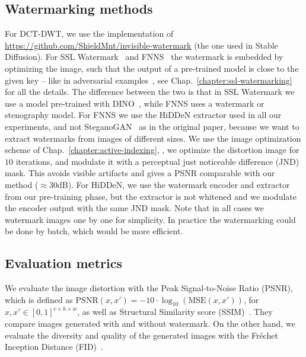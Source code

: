 \subsection{Watermarking methods}\label{chap3/app:watermarking}
For DCT-DWT, we use the implementation of \url{https://github.com/ShieldMnt/invisible-watermark} (the one used in Stable Diffusion).
For SSL Watermark~\citep{fernandez2022sslwatermarking} and FNNS~\citep{kishore2021fixed} the watermark is embedded by optimizing the image, such that the output of a pre-trained model is close to the given key -- like in adversarial examples~\citep{goodfellow2014adversarial}, see Chap.~\ref{chapter:ssl-watermarking} for all the details.
The difference between the two is that in SSL Watermark we use a model pre-trained with DINO~\citep{caron2021dino}, while FNNS uses a watermark or stenography model.
For FNNS we use the HiDDeN extractor used in all our experiments, and not SteganoGAN~\citep{zhang2019steganogan} as in the original paper, because we want to extract watermarks from images of different sizes.
We use the image optimization scheme of Chap.~\ref{chapter:active-indexing}, \ie, we optimize the distortion image for $10$ iterations, and modulate it with a perceptual just noticeable difference (JND) mask.
This avoids visible artifacts and gives a PSNR comparable with our method ($\approx 30$dB).
For HiDDeN, we use the watermark encoder and extractor from our pre-training phase, but the extractor is not whitened and we modulate the encoder output with the same JND mask.
Note that in all cases we watermark images one by one for simplicity. 
In practice the watermarking could be done by batch, which would be more efficient. 









\subsection{Evaluation metrics}\label{chap3/app:metrics}

We evaluate the image distortion with the Peak Signal-to-Noise Ratio (PSNR), which is defined as $\mathrm{PSNR}(x,x') = -10\cdot \log_{10} (\mathrm{MSE}(x,x'))$, for $x,x'\in [0,1]^{c\times h\times w}$, as well as Structural Similarity score (SSIM)~\citep{wang2004image}.
They compare images generated with and without watermark. 
On the other hand, we evaluate the diversity and quality of the generated images with the Fr\'echet Inception Distance (FID)~\citep{heusel2017gans}.

